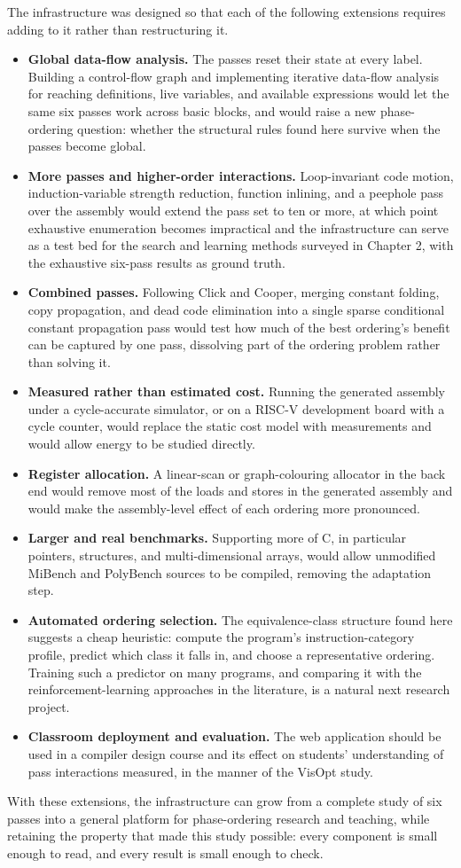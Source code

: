 The infrastructure was designed so that each of the following extensions requires adding to it rather than restructuring it.

\begin{itemize}
  \item \textbf{Global data-flow analysis.} The passes reset their state at every label. Building a control-flow graph and implementing iterative data-flow analysis for reaching definitions, live variables, and available expressions would let the same six passes work across basic blocks, and would raise a new phase-ordering question: whether the structural rules found here survive when the passes become global.
  \item \textbf{More passes and higher-order interactions.} Loop-invariant code motion, induction-variable strength reduction, function inlining, and a peephole pass over the assembly would extend the pass set to ten or more, at which point exhaustive enumeration becomes impractical and the infrastructure can serve as a test bed for the search and learning methods surveyed in Chapter 2, with the exhaustive six-pass results as ground truth.
  \item \textbf{Combined passes.} Following Click and Cooper, merging constant folding, copy propagation, and dead code elimination into a single sparse conditional constant propagation pass would test how much of the best ordering's benefit can be captured by one pass, dissolving part of the ordering problem rather than solving it.
  \item \textbf{Measured rather than estimated cost.} Running the generated assembly under a cycle-accurate simulator, or on a RISC-V development board with a cycle counter, would replace the static cost model with measurements and would allow energy to be studied directly.
  \item \textbf{Register allocation.} A linear-scan or graph-colouring allocator in the back end would remove most of the loads and stores in the generated assembly and would make the assembly-level effect of each ordering more pronounced.
  \item \textbf{Larger and real benchmarks.} Supporting more of C, in particular pointers, structures, and multi-dimensional arrays, would allow unmodified MiBench and PolyBench sources to be compiled, removing the adaptation step.
  \item \textbf{Automated ordering selection.} The equivalence-class structure found here suggests a cheap heuristic: compute the program's instruction-category profile, predict which class it falls in, and choose a representative ordering. Training such a predictor on many programs, and comparing it with the reinforcement-learning approaches in the literature, is a natural next research project.
  \item \textbf{Classroom deployment and evaluation.} The web application should be used in a compiler design course and its effect on students' understanding of pass interactions measured, in the manner of the VisOpt study.
\end{itemize}

With these extensions, the infrastructure can grow from a complete study of six passes into a general platform for phase-ordering research and teaching, while retaining the property that made this study possible: every component is small enough to read, and every result is small enough to check.

